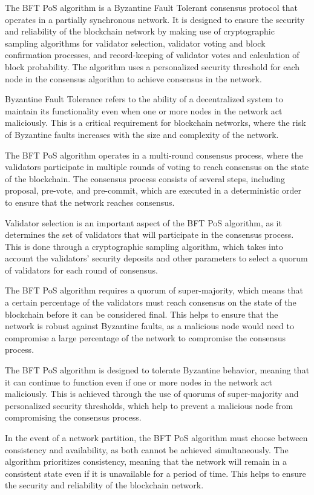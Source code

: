 The BFT PoS algorithm is a Byzantine Fault Tolerant consensus protocol that operates in a partially synchronous network. It is designed to ensure the security and reliability of the blockchain network by making use of cryptographic sampling algorithms for validator selection, validator voting and block confirmation processes, and record-keeping of validator votes and calculation of block probability. The algorithm uses a personalized security threshold for each node in the consensus algorithm to achieve consensus in the network.

Byzantine Fault Tolerance refers to the ability of a decentralized system to maintain its functionality even when one or more nodes in the network act maliciously. This is a critical requirement for blockchain networks, where the risk of Byzantine faults increases with the size and complexity of the network.

The BFT PoS algorithm operates in a multi-round consensus process, where the validators participate in multiple rounds of voting to reach consensus on the state of the blockchain. The consensus process consists of several steps, including proposal, pre-vote, and pre-commit, which are executed in a deterministic order to ensure that the network reaches consensus.

Validator selection is an important aspect of the BFT PoS algorithm, as it determines the set of validators that will participate in the consensus process. This is done through a cryptographic sampling algorithm, which takes into account the validators' security deposits and other parameters to select a quorum of validators for each round of consensus.

The BFT PoS algorithm requires a quorum of super-majority, which means that a certain percentage of the validators must reach consensus on the state of the blockchain before it can be considered final. This helps to ensure that the network is robust against Byzantine faults, as a malicious node would need to compromise a large percentage of the network to compromise the consensus process.

The BFT PoS algorithm is designed to tolerate Byzantine behavior, meaning that it can continue to function even if one or more nodes in the network act maliciously. This is achieved through the use of quorums of super-majority and personalized security thresholds, which help to prevent a malicious node from compromising the consensus process.

In the event of a network partition, the BFT PoS algorithm must choose between consistency and availability, as both cannot be achieved simultaneously. The algorithm prioritizes consistency, meaning that the network will remain in a consistent state even if it is unavailable for a period of time. This helps to ensure the security and reliability of the blockchain network.

